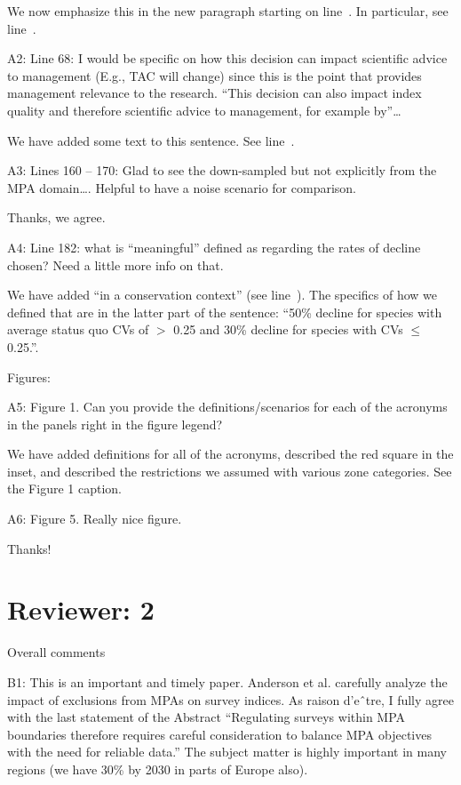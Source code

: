 \documentclass[12pt]{article}
\newcommand{\rev}[1]{{\color{niceblue} #1}}
\newcommand{\lr}[1]{line~\lineref{#1}}
\begin{document}
We now emphasize this in the new paragraph starting on \lr{E1}. In particular, see \lr{A1}.

\rev{A2: Line 68: I would be specific on how this decision can impact scientific advice to management (E.g., TAC will change) since this is the point that provides management relevance to the research. “This decision can also impact index quality and therefore scientific advice to management, for example by”…}

We have added some text to this sentence. See \lr{A2}.

\rev{A3: Lines 160 – 170: Glad to see the down-sampled but not explicitly from the MPA domain…. Helpful to have a noise scenario for comparison.}

Thanks, we agree.

\rev{A4: Line 182: what is ``meaningful'' defined as regarding the rates of decline chosen? Need a little more info on that.}

We have added ``in a conservation context'' (see \lr{A4}). The specifics of how we defined that are in the latter part of the sentence: ``50\% decline for species with average status quo CVs of $>$ 0.25 and 30\% decline for species with CVs $\le$ 0.25.''.

\rev{Figures:}

\rev{A5: Figure 1. Can you provide the definitions/scenarios for each of the acronyms in the panels right in the figure legend?}

We have added definitions for all of the acronyms, described the red square in the inset, and described the restrictions we assumed with various zone categories. See the Figure 1 caption.

\rev{A6: Figure 5. Really nice figure.}

Thanks!

\section{Reviewer: 2}

\rev{Overall comments}

\rev{B1: This is an important and timely paper. Anderson et al. carefully analyze the impact of exclusions from MPAs on survey indices. As raison d’eˆtre, I fully agree with the last statement of the Abstract “Regulating surveys within MPA boundaries therefore requires careful consideration to balance MPA objectives with the need for reliable data.” The subject matter is highly important in many regions (we have 30\% by 2030 in parts of Europe also).}
\end{document}
